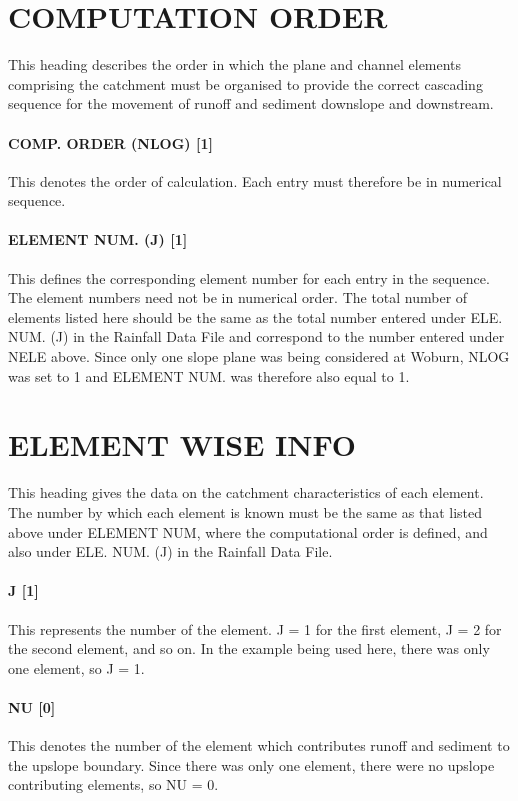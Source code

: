 \section{COMPUTATION ORDER}
\label{sec:COMPUTATIONORDER}

This heading describes the order in which the plane and channel elements
comprising the catchment must be organised to provide the correct cascading
sequence for the movement of runoff and sediment downslope and downstream.
 
\paragraph{COMP. ORDER (NLOG) [1]}
This denotes the order of calculation. Each entry must therefore be in
numerical sequence.
 
\paragraph{ELEMENT NUM. (J) [1]}
This defines the corresponding element number for each entry in the sequence.
The element numbers need not be in numerical order. The total number of elements
listed here should be the same as the total number entered under ELE. NUM. (J)
in the Rainfall Data File and correspond to the number entered under NELE above.
Since only one slope plane was being considered at Woburn, NLOG was set to 1 and
ELEMENT NUM. was therefore also equal to 1.
 
\section{ELEMENT WISE INFO}
\label{sec:ELEMENTWISEINFO}

This heading gives the data on the catchment characteristics of each element.
The number by which each element is known must be the same as that listed above
under ELEMENT NUM, where the computational order is defined, and also under ELE.
NUM. (J) in the Rainfall Data File.
 
\paragraph{J [1]}
This represents the number of the element. J = 1 for the first element, J = 2
for the second element, and so on. In the example being used here, there was
only one element, so J = 1.
 
\paragraph{NU [0]}
This denotes the number of the element which contributes runoff and sediment to
the upslope boundary. Since there was only one element, there were no upslope
contributing elements, so NU = 0.
 
